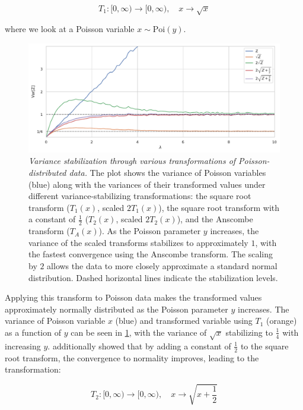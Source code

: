 \begin{equation}
    T_1: [0, \infty) \to [0, \infty), \quad x \to \sqrt{x}
\end{equation}

where we look at a Poisson variable $x \sim \text{Poi}(y)$.

\begin{figure}
    \centering
    \includegraphics[width=1\linewidth]{images/data_transform_anscombe.pdf}
    \caption{\textit{Variance stabilization through various transformations of Poisson-distributed data.} The plot shows the variance of Poisson variables (blue) along with the variances of their transformed values under different variance-stabilizing transformations: the square root transform ($T_1(x)$, scaled $2T_1(x)$), the square root transform with a constant of $\frac{1}{2}$ ($T_2(x)$, scaled $2T_2(x)$), and the Anscombe transform ($T_A(x)$). 
    As the Poisson parameter $y$ increases, the variance of the scaled transforms stabilizes to approximately $1$, with the fastest convergence using the Anscombe transform.
    The scaling by $2$ allows the data to more closely approximate a standard normal distribution. Dashed horizontal lines indicate the stabilization levels.}
    \label{fig:data-transform-anscombe}
\end{figure}

Applying this transform to Poisson data makes the transformed values approximately normally distributed as the Poisson parameter $y$ increases. The variance of Poisson variable $x$ (blue) and transformed variable using $T_1$ (orange) as a function of $y$ can be seen in \cref{fig:data-transform-anscombe}, with the variance of $\sqrt{x}$ stabilizing to $\frac{1}{4}$ with increasing $y$. \citeauthor{bartlettSquareRootTransformation1936} additionally showed that by adding a constant of $\frac{1}{2}$ to the square root transform, the convergence to normality improves, leading to the transformation:

\begin{equation}
    T_2: [0, \infty) \to [0, \infty), \quad x \to \sqrt{x + \frac{1}{2}}
\end{equation}

